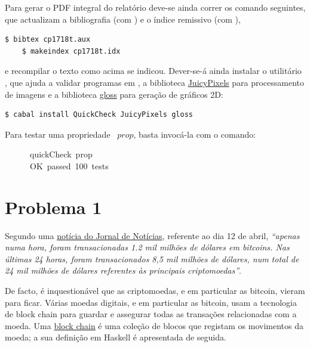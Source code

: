 \documentclass[a4paper]{article}
\newcommand{\Conid}[1]{\mathit{#1}}
\newcommand{\Varid}[1]{\mathit{#1}}
\def\resethooks{%
  \global\let\SaveRestoreHook\empty
  \global\let\ColumnHook\empty}
\let\hspre\empty
\let\hspost\empty
\begin{document}
Para gerar o PDF integral do relatório deve-se ainda correr os comando seguintes,
que actualizam a bibliografia (com \Bibtex) e o índice remissivo (com \Makeindex),
\begin{Verbatim}[fontsize=\small]
    $ bibtex cp1718t.aux
    $ makeindex cp1718t.idx
\end{Verbatim}
e recompilar o texto como acima se indicou. Dever-se-á ainda instalar o utilitário
\QuickCheck,
que ajuda a validar programas em \Haskell, a biblioteca
\href{https://hackage.haskell.org/package/JuicyPixels}{JuicyPixels} para processamento
de imagens e a biblioteca \href{http://gloss.ouroborus.net/}{gloss} para geração de gráficos 2D:
\begin{Verbatim}[fontsize=\small]
    $ cabal install QuickCheck JuicyPixels gloss
\end{Verbatim}
Para testar uma propriedade \QuickCheck~\ensuremath{\Varid{prop}}, basta invocá-la com o comando:
\begin{tabbing}\ttfamily
~~~~~~quickCheck~prop\\
\ttfamily ~~~~~~OK~passed~100~tests
\end{tabbing}

\section*{Problema 1}

Segundo uma \href{https://www.jn.pt/economia/interior/compra-diaria-de-bitcoins-iguala-acoes-da-apple-9257302.html}{notícia do Jornal de Notícias}, 
referente ao dia 12 de abril, \emph{``apenas numa hora, foram transacionadas 1.2 mil milhões de dólares em bitcoins. Nas últimas 24 horas, foram transacionados 8,5 mil milhões de dólares, num total de 24 mil milhões de dólares referentes às principais criptomoedas''}.

De facto, é inquestionável que as criptomoedas, e em particular as bitcoin, vieram para ficar.
%
Várias moedas digitais, e em particular as bitcoin, usam a tecnologia de block chain
para guardar e assegurar todas as transações relacionadas com a moeda.
%
Uma \href{https://en.bitcoin.it/wiki/Block_chain}{block chain} é uma coleção de blocos que registam os movimentos da moeda; a sua definição em Haskell é apresentada de seguida.

\resethooks
\end{document}
